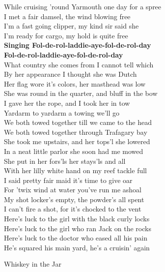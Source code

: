\documentclass[letterpaper,9pt]{article}
\begin{document}
\Large
While cruising 'round Yarmouth one day for a spree \\
I met a fair damsel, the wind blowing free \\
I'm a fast going clipper, my kind sir said she \\
I'm ready for cargo, my hold is quite free \\
\textbf{Singing Fol-de-rol-laddie-aye-fol-de-rol-day \\
Fol-de-rol-laddie-aye-fol-de-rol-day} \\

What country she comes from I cannot tell which \\
By her appearance I thought she was Dutch \\
Her flag wore it's colors, her masthead was low \\
She was round in the quarter, and bluff in the bow \\

I gave her the rope, and I took her in tow \\
Yardarm to yardarm a towing we'll go \\
We both towed together till we came to the head \\
We both towed together through Trafagary bay \\

She took me upstairs, and her tops'l she lowered \\
In a neat little parlor she soon had me mowed \\
She put in her fors'ls her stays'ls and all \\
With her lilly white hand on my reef tackle full \\

I said pretty fair maid it's time to give oar \\
For 'twix wind at water you've run me ashoal \\
My shot locker's empty, the powder's all spent \\
I can't fire a shot, for it's chocked to the vent \\

Here's luck to the girl with the black curly locks \\
Here's luck to the girl who ran Jack on the rocks \\
Here's luck to the doctor who eased all his pain \\
He's squared his main yard, he's a cruisin' again \\

\newpage
{}
\Huge
Whiskey in the Jar\\
\end{document}
